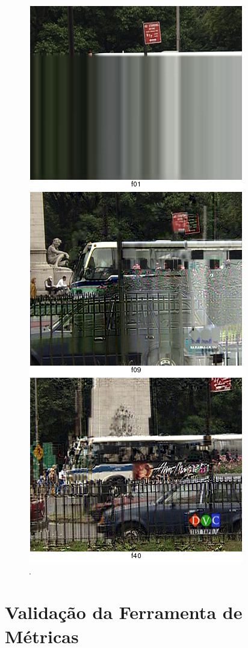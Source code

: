 \begin{figure}[!htb]
	\centering
	\includegraphics[height=0.9\textheight]{./imgs/netsimresult.png}
	\caption{.}
	\label{fig:netsim}
\end{figure}

\section{Validação da Ferramenta de Métricas}


